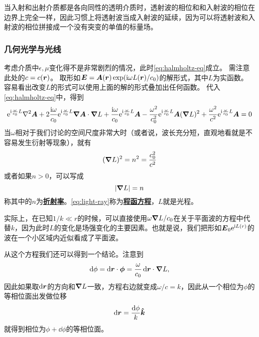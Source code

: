 \documentclass[UTF8, a4paper]{ctexart}
\newcommand*{\ii}{\mathrm{i}}
\newcommand*{\ee}{\mathrm{e}}
\newcommand*{\concept}[1]{\underline{\textbf{#1}}}
\begin{document}
当入射和出射介质都是各向同性的透明介质时，透射波的相位和和入射波的相位在边界上完全一样，因此习惯上将透射波当成入射波的延续，因为可以将透射波和入射波的相位拼接成一个没有突变的单值的标量场。

\subsubsection{几何光学与光线}

考虑介质中$\epsilon, \mu$变化得不是非常剧烈的情况，此时\eqref{eq:halmholtz-eq}成立。
需注意此处的$c=c(\vb*{r})$。
取形如$\vb*{E} = \vb*{A}(\vb*{r}) \exp (\ii \omega L(\vb*{r}) / c_0)$的解形式，其中$L$为实函数。
容易看出改变$L$的形式可以使用上面的解的形式叠加出任何函数。
代入\eqref{eq:halmholtz-eq}中，得到
\[
    \ee^{\ii \frac{\omega}{c_0} L} \laplacian \vb*{A} 
    + 2 \frac{\ii \omega}{c_0} \ee^{\ii \frac{\omega}{c_0} L} \grad{\vb*{A}} \cdot \grad{L} 
    + \frac{\ii \omega}{c_0} \ee^{\ii \frac{\omega}{c_0} L} \vb*{A} 
    - \frac{\omega^2}{c_0^2} \ee^{\ii \frac{\omega}{c_0} L} \vb*{A} (\grad{L})^2 
    + \frac{\omega^2}{c^2} \ee^{\ii \frac{\omega}{c_0} L} \vb*{A} = 0
\]
当$\omega$相对于我们讨论的空间尺度非常大时（或者说，波长充分短，直观地看就是不容易发生衍射等现象），就有
\begin{equation}
    (\grad{L})^2 = n^2 = \frac{c_0^2}{c^2}
    \label{eq:optical-distance}
\end{equation}
或者如果$n>0$，可以写成
\[
    \abs{\grad{L}} = n
\]
称其中的$n$为\concept{折射率}。\eqref{eq:light-ray}称为\concept{程函方程}，$L$就是光程。

实际上，在已知$1/k \ll r$的时候，可以直接使用$\omega\grad{L}/c_0$在关于平面波的方程中代替$k$，因为此时$L$的变化是场强变化的主要因素。也就是说，我们把形如$\vb*{E}_0 \ee^{\ii L(r)}$的波在一个小区域内近似看成了平面波。

从这个方程我们还可以得到一个结论。注意到
\[
    \dd{\phi} = \dd{\vb*{r}} \cdot \vb*{\phi} = \frac{\omega}{c_0} \dd{\vb*{r}} \cdot \grad{L},
\]
因此如果取$\dd{\vb*{r}}$的方向和$\grad{L}$一致，方程右边就变成$\omega / c = k$，因此从一个相位为$\phi$的等相位面出发做位移
\begin{equation}
    \dd{\vb*{r}} = \frac{\dd{\phi}}{k}\vu*{k}
    \label{eq:phrase-movement}
\end{equation}
就得到相位为$\phi + \dd{\phi}$的等相位面。
\end{document}

